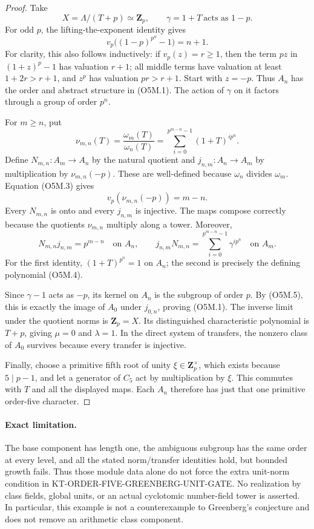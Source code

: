 \begin{proof}
Take
\[
             X=\Lambda/(T+p)\simeq\mathbf Z_p,
             \qquad \gamma=1+T\ \text{acts as }1-p.
                                                               \tag{O5M.2}
\]
For odd $p$, the lifting-the-exponent identity gives
\[
       v_p\bigl((1-p)^{p^n}-1\bigr)=n+1.               \tag{O5M.3}
\]
For clarity, this also follows inductively: if $v_p(z)=r\ge1$,
then the term $pz$ in $(1+z)^p-1$ has valuation $r+1$;
all middle terms have valuation at least $1+2r>r+1$, and
$z^p$ has valuation $pr>r+1$.  Start with $z=-p$.
Thus $A_n$ has the order and abstract structure in (O5M.1).
The action of $\gamma$ on it factors through a group of order $p^n$.

For $m\ge n$, put
\[
 \nu_{m,n}(T)=\frac{\omega_m(T)}{\omega_n(T)}
       =\sum_{i=0}^{p^{m-n}-1}(1+T)^{ip^n}.
                                                               \tag{O5M.4}
\]
Define $N_{m,n}:A_m\to A_n$ by the natural quotient and
$j_{n,m}:A_n\to A_m$ by multiplication by $\nu_{m,n}(-p)$.
These are well-defined because $\omega_n$ divides $\omega_m$.
Equation (O5M.3) gives
\[
              v_p(\nu_{m,n}(-p))=m-n.                 \tag{O5M.5}
\]
Every $N_{m,n}$ is onto and every $j_{n,m}$ is injective.
The maps compose correctly because the quotients $\nu_{m,n}$
multiply along a tower.  Moreover,
\[
 N_{m,n}j_{n,m}=p^{m-n}\quad\text{on }A_n,
 \qquad
 j_{n,m}N_{m,n}=\sum_{i=0}^{p^{m-n}-1}\gamma^{ip^n}
       \quad\text{on }A_m.                            \tag{O5M.6}
\]
For the first identity, $(1+T)^{p^n}=1$ on $A_n$;
the second is precisely the defining polynomial (O5M.4).

Since $\gamma-1$ acts as $-p$, its kernel on $A_n$ is the
subgroup of order $p$.  By (O5M.5), this is exactly the image
of $A_0$ under $j_{0,n}$, proving (O5M.1).
The inverse limit under the quotient norms is $\mathbf Z_p=X$.
Its distinguished characteristic polynomial is $T+p$, giving
$\mu=0$ and $\lambda=1$.  In the direct system of transfers,
the nonzero class of $A_0$ survives because every transfer is
injective.

Finally, choose a primitive fifth root of unity
$\xi\in\mathbf Z_p^{\times}$, which exists because $5\mid p-1$,
and let a generator of $C_5$ act by multiplication by $\xi$.
This commutes with $T$ and all the displayed maps.  Each $A_n$
therefore has just that one primitive order-five character.
\end{proof}

\paragraph{Exact limitation.}
The base component has length one, the ambiguous subgroup has the
same order at every level, and all the stated norm/transfer identities
hold, but bounded growth fails.  Thus those module data alone do not
force the extra unit-norm condition in
KT-ORDER-FIVE-GREENBERG-UNIT-GATE.
No realization by class fields, global units, or an actual
cyclotomic number-field tower is asserted.  In particular, this
example is not a counterexample to Greenberg's conjecture and does
not remove an arithmetic class component.
